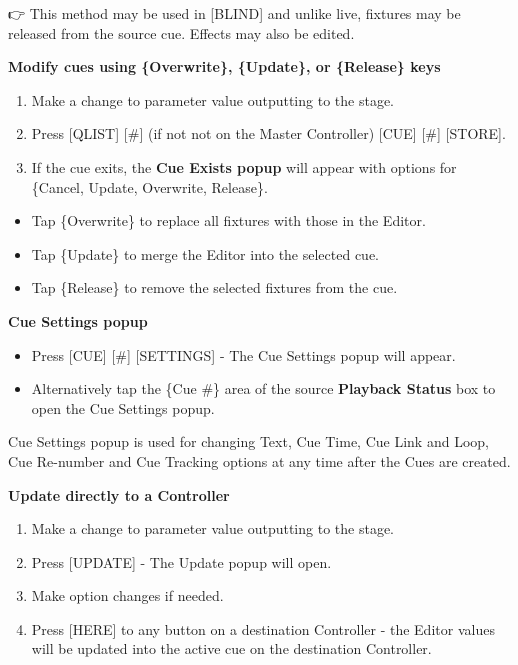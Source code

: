 \documentclass[
]{article}
\providecommand{\tightlist}{%
  \setlength{\itemsep}{0pt}\setlength{\parskip}{0pt}}
\begin{document}
👉 This method may be used in {[}BLIND{]} and unlike live, fixtures may be released from the source cue.
Effects may also be edited.

\textbf{Modify cues using \{Overwrite\}, \{Update\}, or \{Release\} keys}

\begin{enumerate}
\def\labelenumi{\arabic{enumi}.}
\item
  Make a change to parameter value outputting to the stage.
\item
  Press {[}QLIST{]} {[}\#{]} (if not not on the Master Controller) {[}CUE{]} {[}\#{]} {[}STORE{]}.
\item
  If the cue exits, the \textbf{Cue Exists popup} will appear with options for \{Cancel, Update, Overwrite, Release\}.
\end{enumerate}

\begin{itemize}
\item
  Tap \{Overwrite\} to replace all fixtures with those in the Editor.
\item
  Tap \{Update\} to merge the Editor into the selected cue.
\item
  Tap \{Release\} to remove the selected fixtures from the cue.
\end{itemize}

\textbf{Cue Settings popup}

\begin{itemize}
\tightlist
\item
  Press {[}CUE{]} {[}\#{]} {[}SETTINGS{]} - The Cue Settings popup will appear.
\end{itemize}

\begin{itemize}
\tightlist
\item
  Alternatively tap the \{Cue \#\} area of the source \textbf{Playback Status} box to open the Cue Settings popup.
\end{itemize}

Cue Settings popup is used for changing Text, Cue Time, Cue Link and Loop, Cue Re-number and Cue Tracking options at any time after the Cues are created.

\textbf{Update directly to a Controller}

\begin{enumerate}
\def\labelenumi{\arabic{enumi}.}
\item
  Make a change to parameter value outputting to the stage.
\item
  Press {[}UPDATE{]} - The Update popup will open.
\item
  Make option changes if needed.
\item
  Press {[}HERE{]} to any button on a destination Controller - the Editor values will be updated into the active cue on the destination Controller.
\end{enumerate}
\end{document}

